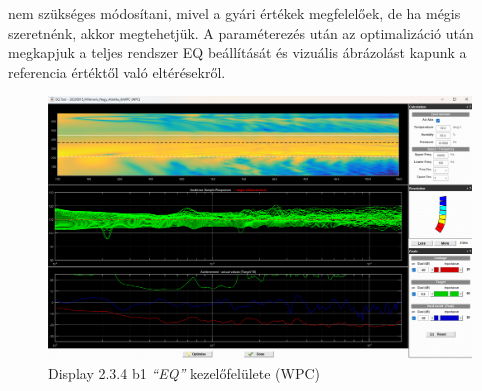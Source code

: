 nem szükséges módosítani, mivel a gyári értékek megfelelőek, de ha mégis szeretnénk, akkor megtehetjük.
A paraméterezés után az optimalizáció után megkapjuk a teljes rendszer EQ beállítását és vizuális ábrázolást kapunk 
a referencia értéktől való eltérésekről.
\begin{figure}[H]
	\centering
	\includegraphics[width=\textwidth, keepaspectratio]{figures/display_wpc_5.png}
	\caption{Display 2.3.4 b1 \textit{``EQ''} kezelőfelülete (WPC)}\label{fig:display_wpc_5}
\end{figure}
